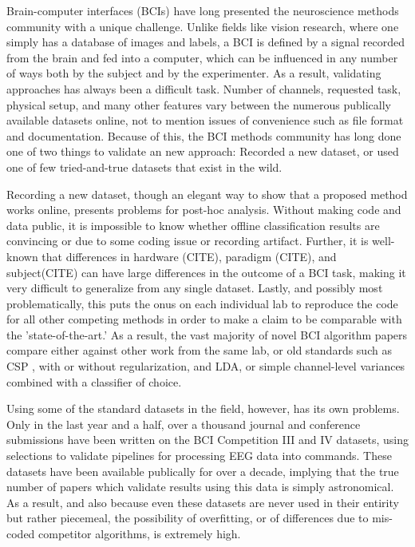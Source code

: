 Brain-computer interfaces (BCIs) have long presented the neuroscience methods
community with a unique challenge. Unlike fields like vision research, where one
simply has a database of images and labels, a BCI is defined by a signal
recorded from the brain and fed into a computer, which can be influenced in any
number of ways both by the subject and by the experimenter. As a result,
validating approaches has always been a difficult task. Number of channels,
requested task, physical setup, and many other features vary between the
numerous publically available datasets online, not to mention issues of
convenience such as file format and documentation. Because of this, the BCI
methods community has long done one of two things to validate an new approach:
Recorded a new dataset, or used one of few tried-and-true datasets that exist in
the wild.

Recording a new dataset, though an elegant way to show that a proposed method
works online, presents problems for post-hoc analysis. Without making code and
data public, it is impossible to know whether offline classification results are
convincing or due to some coding issue or recording artifact. Further, it is
well-known that differences in hardware (CITE), paradigm (CITE), and
subject(CITE) can have large differences in the outcome of a BCI task, making it
very difficult to generalize from any single dataset. Lastly, and possibly most
problematically, this puts the onus on each individual lab to reproduce the code
for all other competing methods in order to make a claim to be comparable with
the 'state-of-the-art.' As a result, the vast majority of novel BCI algorithm
papers compare either against other work from the same lab, or old standards
such as CSP \cite{Lotte2011}, with or without regularization, and LDA, or simple
channel-level variances combined with a classifier of choice. 

Using some of the standard datasets in the field, however, has its own
problems. Only in the last year and a half, over a thousand journal and
conference submissions have been written on the BCI Competition III
\cite{Blankertz2006,Schloegl2005} and IV \cite{Tangermann2012} datasets, using
selections to validate pipelines for processing EEG data into commands. These
datasets have been available publically for over a decade, implying that the
true number of papers which validate results using this data is simply
astronomical. As a result, and also because even these datasets are never used
in their entirity but rather piecemeal, the possibility of overfitting, or of
differences due to mis-coded competitor algorithms, is extremely high.

